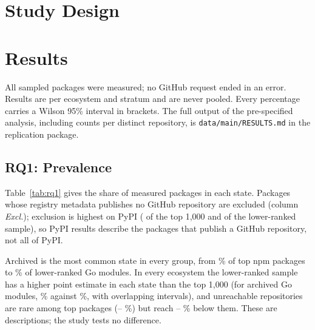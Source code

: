 \documentclass[11pt,a4paper]{article}
\newcommand{\code}[1]{\texttt{#1}}
\begin{document}
\section{Study Design}
\label{sec:design}

\section{Results}
\label{sec:results}
All  sampled packages were measured; no GitHub request ended in an
error. Results are per ecosystem and stratum and are never pooled. Every
percentage carries a Wilson 95\% interval in brackets. The full output of
the pre-specified analysis, including counts per distinct repository, is
\code{data/main/RESULTS.md} in the replication package.

\subsection{RQ1: Prevalence}

Table~\ref{tab:rq1} gives the share of measured packages in each state.
Packages whose registry metadata publishes no GitHub repository are
excluded (column \emph{Excl.}); exclusion is highest on PyPI
( of the top 1,000 and 
of the lower-ranked sample), so PyPI results describe the packages that
publish a GitHub repository, not all of PyPI.

Archived is the most common state in every group, from
\% of top npm packages to \%
of lower-ranked Go modules. In every ecosystem the lower-ranked sample has
a higher point estimate in each state than the top 1,000 (for archived Go
modules, \% against \%, with
overlapping intervals), and unreachable
repositories are rare among top packages (--%
\%) but reach --%
\% below them. These are descriptions; the study
tests no difference.

\begin{table}[t]
\centering\small
\caption{RQ1. Share of measured packages (\%) whose published source
repository is archived, relocated or unreachable, with Wilson 95\%
intervals. A package can be both archived and relocated; \emph{Any}
counts it once. Excl.: no GitHub repository published.}
\label{tab:rq1}
\resizebox{\linewidth}{!}{\tableRQone}
\end{table}
\end{document}
